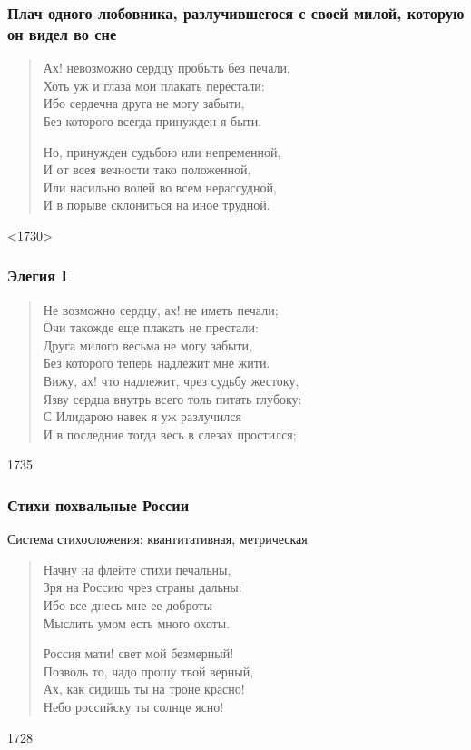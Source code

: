 \documentclass{beamer}
\begin{document}
%

\begin{frame}
\frametitle{Плач одного любовника, разлучившегося с своей милой, которую он видел во сне}

\begin{verse}
Ах! невозможно сердцу пробыть без печали,\\
Хоть уж и глаза мои плакать перестали:\\
Ибо сердечна друга не могу забыти,\\
Без которого всегда принужден я быти.

Но, принужден судьбою или непременной,\\
И от всея вечности тако положенной,\\
Или насильно волей во всем нерассудной,\\
И в порыве склониться на иное трудной.

\end{verse}
<1730>
\end{frame}

\begin{frame}
\frametitle{Элегия I}

\begin{verse}
Не возможно сердцу, ах! не иметь печали;\\
Очи такожде еще плакать не престали:\\
Друга милого весьма не могу забыти,\\
Без которого теперь надлежит мне жити.\\
Вижу, ах! что надлежит, чрез судьбу жестоку,\\
Язву сердца внутрь всего толь питать глубоку:\\
С Илидарою навек я уж разлучился\\
И в последние тогда весь в слезах простился;
\end{verse}
1735
\end{frame}



\begin{frame}
\frametitle{Стихи похвальные России}

Система стихосложения: квантитативная, метрическая

\begin{verse}
Начну на флейте стихи печальны,\\
Зря на Россию чрез страны дальны:\\
Ибо все днесь мне ее доброты\\
Мыслить умом есть много охоты.

Россия мати! свет мой безмерный!\\
Позволь то, чадо прошу твой верный,\\
Ах, как сидишь ты на троне красно!\\
Небо российску ты солнце ясно!

\end{verse}
1728

\end{frame}
\end{document}
